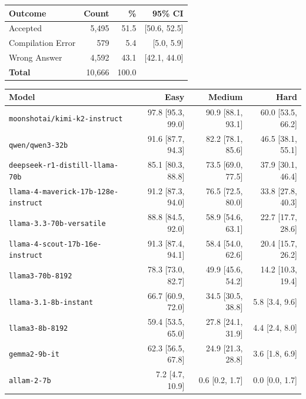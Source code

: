\begin{tabular}{lrrr}
\hline\hline
\textbf{Outcome} & \textbf{Count} & \textbf{\%} & \textbf{95\% CI} \\
\hline
Accepted & 5{,}495 & 51.5 & [50.6, 52.5] \\
Compilation Error & 579 & 5.4 & [5.0, 5.9] \\
Wrong Answer & 4{,}592 & 43.1 & [42.1, 44.0] \\
\hline
\textbf{Total} & 10{,}666 & 100.0 & \\
\hline\hline
\end{tabular}

\begin{tabular}{lrrr}
\hline\hline
\textbf{Model} & \textbf{Easy} & \textbf{Medium} & \textbf{Hard} \\
\hline
\texttt{moonshotai/kimi-k2-instruct} & 97.8 {\scriptsize[95.3, 99.0]} & 90.9 {\scriptsize[88.1, 93.1]} & 60.0 {\scriptsize[53.5, 66.2]} \\
\texttt{qwen/qwen3-32b} & 91.6 {\scriptsize[87.7, 94.3]} & 82.2 {\scriptsize[78.1, 85.6]} & 46.5 {\scriptsize[38.1, 55.1]} \\
\texttt{deepseek-r1-distill-llama-70b} & 85.1 {\scriptsize[80.3, 88.8]} & 73.5 {\scriptsize[69.0, 77.5]} & 37.9 {\scriptsize[30.1, 46.4]} \\
\texttt{llama-4-maverick-17b-128e-instruct} & 91.2 {\scriptsize[87.3, 94.0]} & 76.5 {\scriptsize[72.5, 80.0]} & 33.8 {\scriptsize[27.8, 40.3]} \\
\texttt{llama-3.3-70b-versatile} & 88.8 {\scriptsize[84.5, 92.0]} & 58.9 {\scriptsize[54.6, 63.1]} & 22.7 {\scriptsize[17.7, 28.6]} \\
\texttt{llama-4-scout-17b-16e-instruct} & 91.3 {\scriptsize[87.4, 94.1]} & 58.4 {\scriptsize[54.0, 62.6]} & 20.4 {\scriptsize[15.7, 26.2]} \\
\texttt{llama3-70b-8192} & 78.3 {\scriptsize[73.0, 82.7]} & 49.9 {\scriptsize[45.6, 54.2]} & 14.2 {\scriptsize[10.3, 19.4]} \\
\texttt{llama-3.1-8b-instant} & 66.7 {\scriptsize[60.9, 72.0]} & 34.5 {\scriptsize[30.5, 38.8]} & 5.8 {\scriptsize[3.4, 9.6]} \\
\texttt{llama3-8b-8192} & 59.4 {\scriptsize[53.5, 65.0]} & 27.8 {\scriptsize[24.1, 31.9]} & 4.4 {\scriptsize[2.4, 8.0]} \\
\texttt{gemma2-9b-it} & 62.3 {\scriptsize[56.5, 67.8]} & 24.9 {\scriptsize[21.3, 28.8]} & 3.6 {\scriptsize[1.8, 6.9]} \\
\texttt{allam-2-7b} & 7.2 {\scriptsize[4.7, 10.9]} & 0.6 {\scriptsize[0.2, 1.7]} & 0.0 {\scriptsize[0.0, 1.7]} \\
\hline\hline
\end{tabular}

